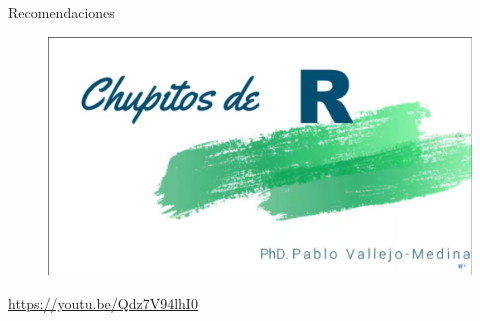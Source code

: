\documentclass{beamer}
\begin{document}
\begin{frame}{Recomendaciones}
\begin{figure}
\centering
\includegraphics[width=.9\textwidth]{Chupitos.png}
\end{figure}  
\textcolor{blue}{\url{https://youtu.be/Qdz7V94lhI0}}
\end{frame}
\end{document}
